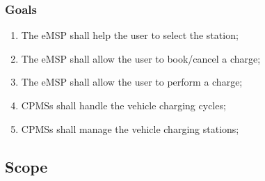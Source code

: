 \subsubsection{Goals}
%
\begin{enumerate}[label=\textbf{G\arabic*}]
    \item The \ac{eMSP} shall help the user to select the station; \label{goal:eMSP-helps-selecting}
    \item The \ac{eMSP} shall allow the user to book/cancel a charge; \label{goal:eMSP-booking-charge}
    \item The \ac{eMSP} shall allow the user to perform a charge; \label{goal:eMSP-allow-charge}
    \item \acp{CPMS} shall handle the vehicle charging cycles; \label{goal:CPMS-handles-charge}
    \item \acp{CPMS} shall manage the vehicle charging stations; \label{goal:CPMS-manage-station}
\end{enumerate}

\subsection{Scope}

